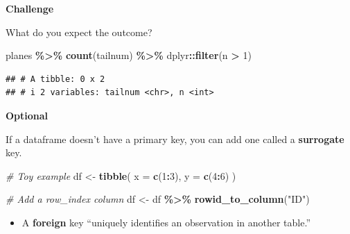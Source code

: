\documentclass[
]{book}
\newenvironment{Shaded}{\begin{snugshade}}{\end{snugshade}}
\newcommand{\AttributeTok}[1]{\textcolor[rgb]{0.13,0.29,0.53}{#1}}
\newcommand{\CommentTok}[1]{\textcolor[rgb]{0.56,0.35,0.01}{\textit{#1}}}
\newcommand{\DecValTok}[1]{\textcolor[rgb]{0.00,0.00,0.81}{#1}}
\newcommand{\FunctionTok}[1]{\textcolor[rgb]{0.13,0.29,0.53}{\textbf{#1}}}
\newcommand{\NormalTok}[1]{#1}
\newcommand{\OtherTok}[1]{\textcolor[rgb]{0.56,0.35,0.01}{#1}}
\newcommand{\SpecialCharTok}[1]{\textcolor[rgb]{0.81,0.36,0.00}{\textbf{#1}}}
\newcommand{\StringTok}[1]{\textcolor[rgb]{0.31,0.60,0.02}{#1}}
\providecommand{\tightlist}{%
  \setlength{\itemsep}{0pt}\setlength{\parskip}{0pt}}
\begin{document}
\textbf{Challenge}

What do you expect the outcome?

\begin{Shaded}
\begin{Highlighting}[]
\NormalTok{planes }\SpecialCharTok{\%\textgreater{}\%}
  \FunctionTok{count}\NormalTok{(tailnum) }\SpecialCharTok{\%\textgreater{}\%}
\NormalTok{  dplyr}\SpecialCharTok{::}\FunctionTok{filter}\NormalTok{(n }\SpecialCharTok{\textgreater{}} \DecValTok{1}\NormalTok{)}
\end{Highlighting}
\end{Shaded}

\begin{verbatim}
## # A tibble: 0 x 2
## # i 2 variables: tailnum <chr>, n <int>
\end{verbatim}

\textbf{Optional}

If a dataframe doesn't have a primary key, you can add one called a \textbf{surrogate} key.

\begin{Shaded}
\begin{Highlighting}[]
\CommentTok{\# Toy example}
\NormalTok{df }\OtherTok{\textless{}{-}} \FunctionTok{tibble}\NormalTok{(}
  \AttributeTok{x =} \FunctionTok{c}\NormalTok{(}\DecValTok{1}\SpecialCharTok{:}\DecValTok{3}\NormalTok{),}
  \AttributeTok{y =} \FunctionTok{c}\NormalTok{(}\DecValTok{4}\SpecialCharTok{:}\DecValTok{6}\NormalTok{)}
\NormalTok{)}

\CommentTok{\# Add a row\_index column}
\NormalTok{df }\OtherTok{\textless{}{-}}\NormalTok{ df }\SpecialCharTok{\%\textgreater{}\%} \FunctionTok{rowid\_to\_column}\NormalTok{(}\StringTok{"ID"}\NormalTok{)}
\end{Highlighting}
\end{Shaded}

\begin{itemize}
\tightlist
\item
  A \textbf{foreign} key ``uniquely identifies an observation in another table.''
\end{itemize}

\begin{Shaded}
\end{Shaded}
\end{document}
